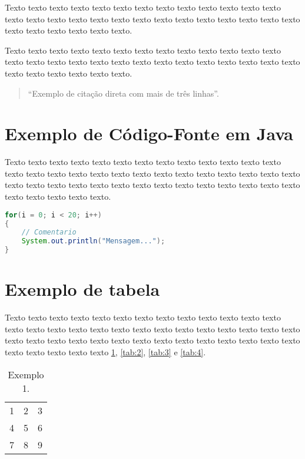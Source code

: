 \documentclass[tcc2]{uftex}
\begin{document}
\noindent Texto texto texto texto texto texto texto texto texto texto texto texto texto
texto texto texto texto texto texto texto texto texto texto texto texto texto
texto texto texto texto texto texto texto. 

Texto texto texto texto texto texto texto texto texto texto texto texto texto
texto texto texto texto texto texto texto texto texto texto texto texto texto
texto texto texto texto texto texto texto.

\begin{quote}
``Exemplo de citação direta com mais de três linhas''.
\end{quote}

\section{Exemplo de Código-Fonte em Java}
\label{sec:exemplo_codigo_fonte}

\noindent Texto texto texto texto texto texto texto texto texto texto texto texto texto
texto texto texto texto texto texto texto texto texto texto texto texto texto
texto texto texto texto texto texto texto texto texto texto texto texto texto
texto texto texto texto texto texto texto. 

\begin{lstlisting}[language=Java]
for(i = 0; i < 20; i++)
{
    // Comentario 
    System.out.println("Mensagem...");
}
\end{lstlisting}

\section{Exemplo de tabela}
\label{sec:exemplo_tabela}

\noindent Texto texto texto texto texto texto texto texto texto texto texto texto texto
texto texto texto texto texto texto texto texto texto texto texto texto texto
texto texto texto texto texto texto texto texto texto texto texto texto texto
texto texto texto texto texto texto texto \ref{tab:1}, \ref{tab:2}, \ref{tab:3} e \ref{tab:4}.

\begin{table}[!h]
\caption{Exemplo 1.}\label{tab:1}
\begin{tabular}{ l c r }
  1 & 2 & 3 \\
  4 & 5 & 6 \\
  7 & 8 & 9 \\
\end{tabular}
\end{table}
\end{document}
